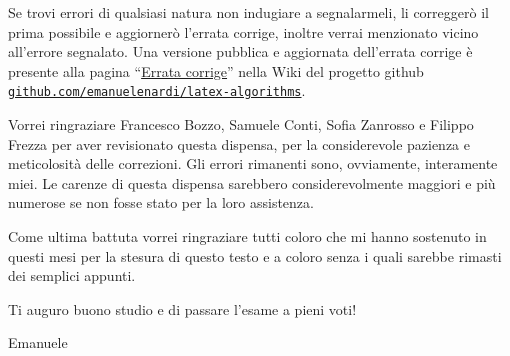 Se trovi errori di qualsiasi natura non indugiare a segnalarmeli, li correggerò il prima possibile e aggiornerò l'errata corrige, inoltre verrai menzionato vicino all'errore segnalato.
Una versione pubblica e aggiornata dell'errata corrige è presente alla pagina \enquote{\href{https://github.com/emanuelenardi/latex-algorithms/wiki/Errata-corrige}{Errata corrige}} nella Wiki del progetto github \href{https://github.com/emanuelenardi/latex-algorithms}{\texttt{github.com/emanuelenardi/latex-algorithms}}.

Vorrei ringraziare Francesco Bozzo, Samuele Conti, Sofia Zanrosso e Filippo Frezza per aver revisionato questa dispensa, per la considerevole pazienza e meticolosità delle correzioni.
Gli errori rimanenti sono, ovviamente, interamente miei.
Le carenze di questa dispensa sarebbero considerevolmente maggiori e più numerose se non fosse stato per la loro assistenza.

Come ultima battuta vorrei ringraziare tutti coloro che mi hanno sostenuto in questi mesi per la stesura di questo testo e a coloro senza i quali sarebbe rimasti dei semplici appunti.

Ti auguro buono studio e di passare l'esame a pieni voti!

Emanuele
